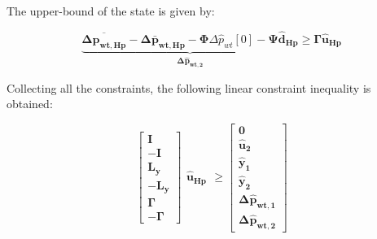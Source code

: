 The upper-bound of the state is given by:

\begin{equation}
\underbrace{\overline{\bm{\Delta p_{wt,Hp}}} - \bm{\Delta \bar{p}_{wt,Hp}} -  \bm{\Phi} \Delta \hat{p}_{wt}[0] - \bm{\Psi} \bm{\hat{d}_{Hp}}}_{\bm{\Delta \hat{p}_{wt,2}}} \geq \bm{\Gamma} \bm{\hat{u}_{Hp}}
\end{equation}

Collecting all the constraints, the following linear constraint inequality is obtained:

\begin{equation}
	\begin{bmatrix}
		\bm{I} 	\\
		-\bm{I} 	\\
		\bm{L_{y}}	\\
		-\bm{L_{y}}	\\
		\bm{\Gamma}	\\
		-\bm{\Gamma}
	\end{bmatrix}
	\begin{matrix}
			\bm{\hat{u}_{Hp}}
	\end{matrix}
	\geq 
	\begin{bmatrix}
			\bm{0}	\\
			\bm{\hat{u}_{2}}	\\
			\bm{\hat{y}_{1}}	\\
			\bm{\hat{y}_{2}}	\\
			\bm{\Delta \hat{p}_{wt,1}}	\\
			\bm{\Delta \hat{p}_{wt,2}}	
	\end{bmatrix}
\end{equation}






